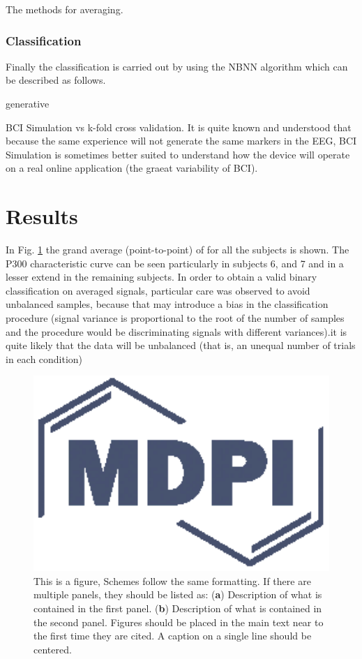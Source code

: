 \documentclass[entropy,article,submit,moreauthors,pdftex,10pt,a4paper]{mdpi}
\begin{document}
The methods for averaging.

\subsubsection{Classification}

Finally the classification is carried out by using the NBNN algorithm which can be described as follows.

generative

BCI Simulation vs k-fold cross validation.  It is quite known and understood that because the same experience will not generate the same markers in the EEG, BCI Simulation is sometimes better suited to understand how the device will operate on a real online application (the graeat variability of BCI).

\section{Results}

In Fig. \ref{fig:subjectaveraged} the grand average (point-to-point) of for all the subjects is shown.  The P300 characteristic curve can be seen particularly in subjects 6, and 7 and in a lesser extend in the remaining subjects. In order to obtain a valid binary classification on averaged signals, particular care was observed to avoid unbalanced samples, because that may introduce a bias in the classification procedure (signal variance is proportional to the root of the number of samples and the procedure would be discriminating signals with different variances).it is quite likely that the data will be unbalanced (that is, an unequal number of trials in each condition)


\begin{figure}[H]
\centering
\includegraphics[width=18cm]{subjectaveraged.eps}
\caption{This is a figure, Schemes follow the same formatting. If there are multiple panels, they should be listed as: (\textbf{a}) Description of what is contained in the first panel. (\textbf{b}) Description of what is contained in the second panel. Figures should be placed in the main text near to the first time they are cited. A caption on a single line should be centered.}
\label{fig:subjectaveraged}
\end{figure}
\end{document}
